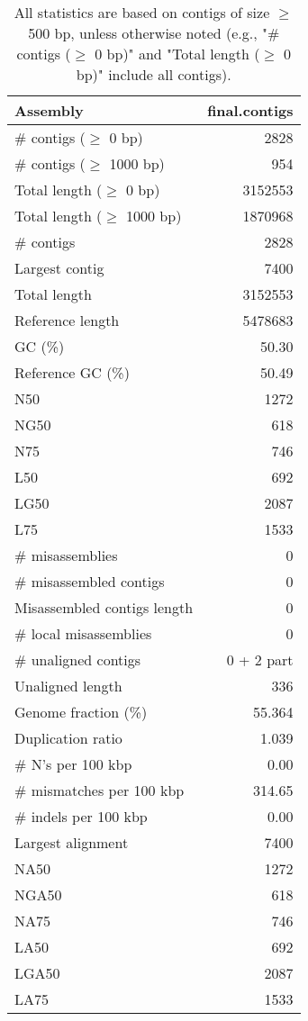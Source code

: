 \documentclass[12pt,a4paper]{article}
\begin{document}
\begin{table}[ht]
\begin{center}
\caption{All statistics are based on contigs of size $\geq$ 500 bp, unless otherwise noted (e.g., "\# contigs ($\geq$ 0 bp)" and "Total length ($\geq$ 0 bp)" include all contigs).}
\begin{tabular}{|l*{1}{|r}|}
\hline
Assembly & final.contigs \\ \hline
\# contigs ($\geq$ 0 bp) & 2828 \\ \hline
\# contigs ($\geq$ 1000 bp) & 954 \\ \hline
Total length ($\geq$ 0 bp) & 3152553 \\ \hline
Total length ($\geq$ 1000 bp) & 1870968 \\ \hline
\# contigs & 2828 \\ \hline
Largest contig & 7400 \\ \hline
Total length & 3152553 \\ \hline
Reference length & 5478683 \\ \hline
GC (\%) & 50.30 \\ \hline
Reference GC (\%) & 50.49 \\ \hline
N50 & 1272 \\ \hline
NG50 & 618 \\ \hline
N75 & 746 \\ \hline
L50 & 692 \\ \hline
LG50 & 2087 \\ \hline
L75 & 1533 \\ \hline
\# misassemblies & 0 \\ \hline
\# misassembled contigs & 0 \\ \hline
Misassembled contigs length & 0 \\ \hline
\# local misassemblies & 0 \\ \hline
\# unaligned contigs & 0 + 2 part \\ \hline
Unaligned length & 336 \\ \hline
Genome fraction (\%) & 55.364 \\ \hline
Duplication ratio & 1.039 \\ \hline
\# N's per 100 kbp & 0.00 \\ \hline
\# mismatches per 100 kbp & 314.65 \\ \hline
\# indels per 100 kbp & 0.00 \\ \hline
Largest alignment & 7400 \\ \hline
NA50 & 1272 \\ \hline
NGA50 & 618 \\ \hline
NA75 & 746 \\ \hline
LA50 & 692 \\ \hline
LGA50 & 2087 \\ \hline
LA75 & 1533 \\ \hline
\end{tabular}
\end{center}
\end{table}
\end{document}
